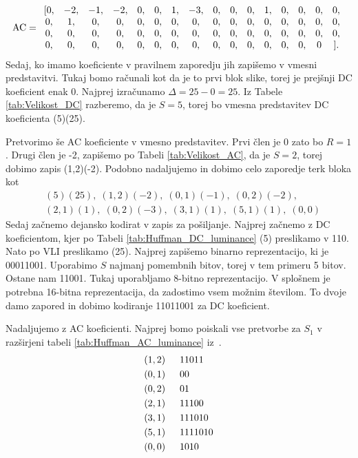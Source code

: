 \documentclass[a4paper,12pt,openright]{book}
\begin{document}
\begin{gather*}
 \hbox{AC} =
  \begin{array}{*{16}c}
    [0,& -2,& -1,& -2,& 0,& 0,& 1,& -3,& 0,& 0,& 0,& 1,& 0,& 0,& 0,& 0,\\
    0,&  1,&  0,&  0,& 0,& 0,& 0,&  0,& 0,& 0,& 0,& 0,& 0,& 0,& 0,& 0,\\
    0,&  0,&  0,&  0,& 0,& 0,& 0,&  0,& 0,& 0,& 0,& 0,& 0,& 0,& 0,& 0,\\
    0,&  0,&  0,&  0,& 0,& 0,& 0,&  0,& 0,& 0,& 0,& 0,& 0,& 0,& 0& ].\\
  \end{array}
\end{gather*}
Sedaj, ko imamo koeficiente v pravilnem zaporedju jih zapišemo v vmesni predstavitvi. Tukaj bomo računali kot da je to prvi blok slike, torej je prejšnji DC koeficient enak 0. Najprej izračunamo $\Delta = 25-0 = 25$. Iz Tabele \ref{tab:Velikost_DC} razberemo, da je $S = 5$, torej bo vmesna predstavitev DC koeficienta (5)(25). \par
Pretvorimo še AC koeficiente v vmesno predstavitev. Prvi člen je 0 zato bo $R = 1$. Drugi člen je -2, zapišemo po Tabeli \ref{tab:Velikost_AC}, da je $S = 2$, torej dobimo zapis (1,2)(-2). Podobno nadaljujemo in dobimo celo zaporedje terk bloka kot
\begin{equation*}
  \begin{aligned}
    &(5)(25),\;(1,2)(-2),\;(0,1)(-1),\;(0,2)(-2),\\
    &(2,1)(1),\;(0,2)(-3),\;(3,1)(1),\;(5,1)(1),\;(0,0)
  \end{aligned}
\end{equation*}
Sedaj začnemo dejansko kodirat v zapis za pošiljanje. Najprej začnemo z DC koeficientom, kjer po Tabeli \ref{tab:Huffman_DC_luminance} (5) preslikamo v 110. Nato po VLI preslikamo (25). Najprej zapišemo binarno reprezentacijo, ki je 00011001. Uporabimo $S$ najmanj pomembnih bitov, torej v tem primeru 5 bitov. Ostane nam 11001. Tukaj uporabljamo 8-bitno reprezentacijo. V splošnem je potrebna 16-bitna reprezentacija, da zadostimo vsem možnim številom. To dvoje damo zapored in dobimo kodiranje 11011001 za DC koeficient.\par
Nadaljujemo z AC koeficienti. Najprej bomo poiskali vse pretvorbe za $S_1$ v razširjeni tabeli \ref{tab:Huffman_AC_luminance} iz~\cite{ISO/IEC_10918-1}. 
\begin{equation*}
  \begin{aligned}
    &(1,2)\indent 11011   \\
    &(0,1)\indent 00   \\
    &(0,2)\indent 01   \\
    &(2,1)\indent 11100   \\
    &(3,1)\indent 111010   \\
    &(5,1)\indent 1111010   \\
    &(0,0)\indent 1010 
  \end{aligned}
\end{equation*}
\end{document}
